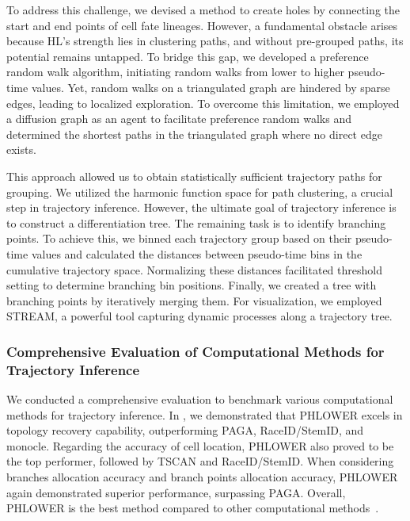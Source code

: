 To address this challenge, we devised a method to create holes by connecting the start and end points of cell fate lineages. However, a fundamental obstacle arises because HL's strength lies in clustering paths, and without pre-grouped paths, its potential remains untapped. To bridge this gap, we developed a preference random walk algorithm, initiating random walks from lower to higher pseudo-time values. Yet, random walks on a triangulated graph are hindered by sparse edges, leading to localized exploration. To overcome this limitation, we employed a diffusion graph as an agent to facilitate preference random walks and determined the shortest paths in the triangulated graph where no direct edge exists.

This approach allowed us to obtain statistically sufficient trajectory paths for grouping. We utilized the harmonic function space for path clustering, a crucial step in trajectory inference. However, the ultimate goal of trajectory inference is to construct a differentiation tree. The remaining task is to identify branching points. To achieve this, we binned each trajectory group based on their pseudo-time values and calculated the distances between pseudo-time bins in the cumulative trajectory space. Normalizing these distances facilitated threshold setting to determine branching bin positions. Finally, we created a tree with branching points by iteratively merging them. For visualization, we employed STREAM, a powerful tool capturing dynamic processes along a trajectory tree.

\subsubsection{Comprehensive Evaluation of Computational Methods for Trajectory Inference}
We conducted a comprehensive evaluation to benchmark various computational methods for trajectory inference. In , we demonstrated that PHLOWER excels in topology recovery capability, outperforming PAGA, RaceID/StemID, and monocle. Regarding the accuracy of cell location, PHLOWER also proved to be the top performer, followed by TSCAN and RaceID/StemID. When considering branches allocation accuracy and branch points allocation accuracy, PHLOWER again demonstrated superior performance, surpassing PAGA. Overall, PHLOWER is the best method compared to other computational methods~\citep{duverle2016celltree,albergante2020ElPiGraph,cao2019monocle3,herring2018pCreode,grun2016stemid,guo2017slice,street2018slingshot,chen2019stream,ji2016tscan}.

